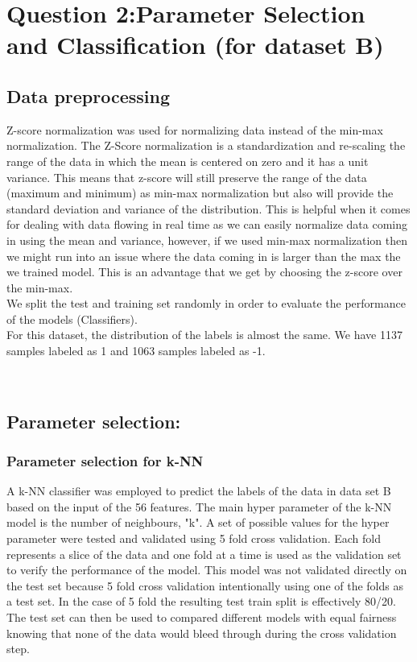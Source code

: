 \section{Question 2:Parameter Selection and Classification (for dataset B)}
\subsection{Data preprocessing}
Z-score normalization was used for normalizing data instead of the min-max normalization. The Z-Score normalization is a standardization and re-scaling the range of the data in which the mean is centered on zero and it has a unit variance. This means that z-score will still preserve the range of the data (maximum and minimum) as min-max normalization but also will provide the standard deviation and variance of the distribution. This is helpful when it comes for dealing with data flowing in real time as we can easily normalize data coming in using the mean and variance, however, if we used min-max normalization then we might run into an issue where the data coming in is larger than the max the we trained model. This is an advantage that we get by choosing the z-score over the min-max. \\
We split the test and training set randomly in order to evaluate the performance of the models (Classifiers). \\
For this dataset, the distribution of the labels is almost the same. We have 1137 samples labeled as 1 and 1063 samples labeled as -1.


\\
\subsection{Parameter selection:}
\subsubsection{Parameter selection for k-NN}

A k-NN classifier was employed to predict the labels of the data in data set B based on the input of the 56 features. The main hyper parameter of the k-NN model is the number of neighbours, "k". A set of possible values for the hyper parameter were tested and validated using 5 fold cross validation. Each fold represents a slice of the data and one fold at a time is used as the validation set to verify the performance of the model. This model was not validated directly on the test set because 5 fold cross validation intentionally using one of the folds as a test set. In the case of 5 fold the resulting test train split is effectively 80/20. The test set can then be used to compared different models with equal fairness knowing that none of the data would bleed through during the cross validation step.

